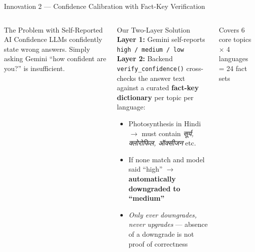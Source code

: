 \documentclass[aspectratio=169, 12pt]{beamer}
\newcommand{\tick}{\textcolor{deepgreen}{\faCheckCircle}}
\begin{document}
\begin{frame}{Innovation 2 — Confidence Calibration with Fact-Key Verification}
  \begin{columns}[T]
      \begin{alertblock}{The Problem with Self-Reported AI Confidence}
        LLMs confidently state wrong answers. Simply asking Gemini
        ``how confident are you?'' is insufficient.
      \end{alertblock}
      \vspace{6pt}
      \begin{block}{Our Two-Layer Solution}
        \textbf{Layer 1:} Gemini self-reports \texttt{high / medium / low}\\[4pt]
        \textbf{Layer 2:} Backend \texttt{verify\_confidence()} cross-checks
        the answer text against a curated \textbf{fact-key dictionary}
        per topic per language:
        \begin{itemize}
          \item Photosynthesis in Hindi $\to$ must contain
                \emph{सूर्य, क्लोरोफिल, ऑक्सीजन} etc.
          \item If none match and model said ``high'' $\to$
                \textbf{automatically downgraded to ``medium''}
          \item \emph{Only ever downgrades, never upgrades} ---
                absence of a downgrade is not proof of correctness
        \end{itemize}
      \end{block}
      \vspace{6pt}
      {\scriptsize Covers 6 core topics $\times$ 4 languages = 24 fact sets}
  \end{columns}
\end{frame}
\end{document}
